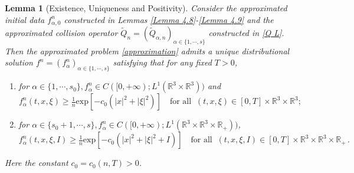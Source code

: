 \documentclass[reqno,11pt]{amsart}
\newtheorem{lemma}{Lemma}[section]
\numberwithin{equation}{section}
\def\R{\mathbb{R}}
\def\exp{\mathrm{exp}}
\begin{document}
\begin{lemma}[Existence, Uniqueness and Positivity]\label{Lemma 4.14}
Consider the approximated initial data $f_{\alpha, 0}^n$ constructed in Lemmas \ref{Lemma 4.8}-\ref{Lemma 4.9} and the approximated collision operator $\tilde{Q}_{n} = ( \tilde{Q}_{\alpha, n} )_{\alpha \in \{ 1, \cdots, s \}}$ constructed in \eqref{Q L}. Then the approximated problem \eqref{approximation} admits a unique distributional solution $f^n = ( f^n_\alpha )_{\alpha \in \{ 1, \cdots, s \}}$ satisfying that for any fixed $T>0$,
\begin{enumerate}
\item{for $\alpha \in \{1,\cdots,s_0\}, f^n_\alpha \in C([0,+\infty ); L^1(\R^3 \times \R^3 ))$ and
\begin{equation*}
	f^n_\alpha (t,x,\xi ) \geq \tfrac{1}{n} \exp [ -c_0 (|x|^2+|\xi |^2 ) ] \quad \textrm{for all } \ (t,x,\xi ) \in [0, T] \times \R^3 \times \R^3 ;
	\end{equation*}}
\item{for $\alpha \in \{s_0+1,\cdots,s\}, f^n_\alpha \in C([0,+\infty ); L^1(\R^3 \times \R^3 \times \R_+))$,
	\begin{equation*}
		f^n_\alpha (t,x,\xi , I ) \geq \tfrac{1}{n} \exp [ -c_0 (|x|^2+|\xi |^2 + I ) ] \quad \textrm{for all } \ (t,x,\xi , I ) \in [0, T] \times \R^3 \times \R^3 \times \R_+ \,.
\end{equation*}}	
\end{enumerate}
Here the constant $c_0 = c_0 (n,T)>0 $.
\end{lemma}
\end{document}
